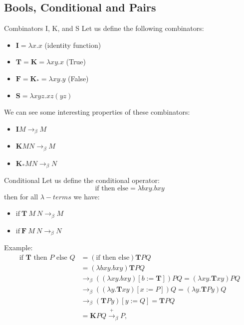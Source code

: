 \documentclass{beamer}
\begin{document}
\subsection{Bools, Conditional and Pairs}
\begin{frame}{Combinators I, K, and S}
  Let us define the following combinators:
  \begin{itemize}
    \item \( \mathbf{I} = \lambda x.x \) (identity function)
    \item \(\mathbf{T} = \textbf{K} = \lambda xy.x \) (True)

    \item \( \mathbf{F} =\mathbf{K}_* = \lambda xy.y \) (False)
    \item \( \mathbf{S} = \lambda xyz. xz(yz) \) 
  \end{itemize}
  We can see some interesting properties of these combinators:
  \begin{itemize}
    \item \(\mathbf{I}M \rightarrow_\beta M\)
    \item \(\mathbf{K}MN \rightarrow_\beta M\)
    \item \(\mathbf{K}_*MN \rightarrow_\beta N\)
  \end{itemize}
\end{frame}

\begin{frame}{Conditional}
  Let us define the conditional operator:
  \[
    \text{if then else} = \lambda bxy. bxy
  \]
  then for all \(\lambda-terms\) we have:

  \begin{itemize}
    \item \(\text{if}\ \mathbf{T}\ M\ N \rightarrow_\beta M\)
    \item \(\text{if}\ \mathbf{F}\ M\ N \rightarrow_\beta N\)
  \end{itemize}
  Example:
  \[
  \begin{aligned}
      \text{if } \mathbf{T} \text{ then } P \text{ else } Q &= (\text{if then else}) \mathbf{T} P Q \\
      &= (\lambda bxy. bxy) \mathbf{T} P Q \\
      &\rightarrow_{\beta} ((\lambda xy. bxy)[b := \mathbf{T}]) P Q = (\lambda xy. \mathbf{T}xy) P Q \\
      &\rightarrow_{\beta} ((\lambda y. \mathbf{T}xy)[x := P]) Q = (\lambda y. \mathbf{T}Py) Q \\
      &\rightarrow_{\beta} (\mathbf{T}Py)[y := Q] = \mathbf{T} P Q \\
      &= \mathbf{K} P Q \xrightarrow{+}_{\beta} P,
  \end{aligned}
  \]
\end{frame}
\end{document}

